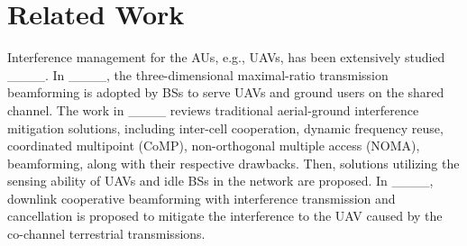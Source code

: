\section{Related Work}
\label{secRelatedWork}
Interference management for the AUs, e.g., UAVs, has been extensively studied ____.
In ____, the three-dimensional maximal-ratio transmission beamforming is adopted by BSs to serve UAVs and ground users on the shared channel.
The work in ____ reviews traditional aerial-ground interference mitigation solutions, including inter-cell cooperation, dynamic frequency reuse, coordinated multipoint (CoMP), non-orthogonal multiple access (NOMA), beamforming, along with their respective drawbacks.
Then, solutions utilizing the sensing ability of UAVs and idle BSs in the network are proposed.
In ____, downlink cooperative beamforming with interference transmission and cancellation is proposed to mitigate the interference to the UAV caused by the co-channel terrestrial transmissions.


